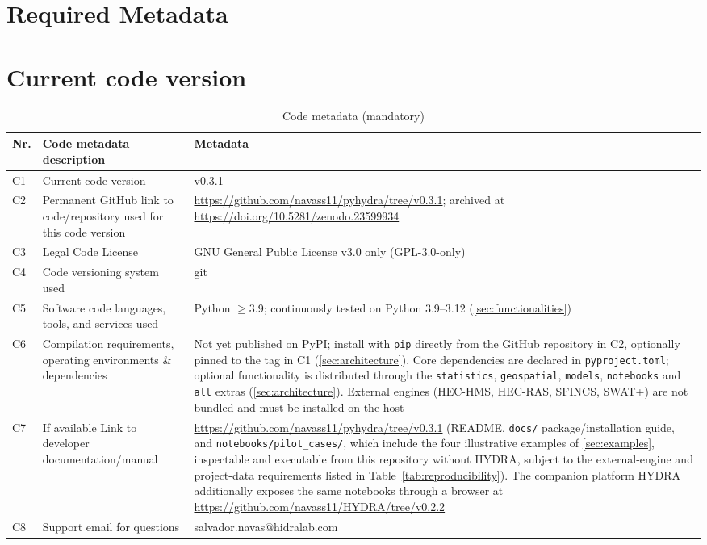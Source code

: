\documentclass[preprint,12pt,a4paper]{elsarticle}
\begin{document}
\section*{Required Metadata}
\label{sec:metadata}

\section*{Current code version}

\begin{table}[h]
\footnotesize
\begin{tabular}{@{}p{}p{}p{}@{}}
\toprule
Nr. & Code metadata description & Metadata \\
\midrule
C1 & Current code version & v0.3.1 \\[3pt]
C2 & Permanent GitHub link to code/repository used for this code version &
\url{https://github.com/navass11/pyhydra/tree/v0.3.1}; archived at
\url{https://doi.org/10.5281/zenodo.23599934} \\[3pt]
C3 & Legal Code License & GNU General Public License v3.0 only (GPL-3.0-only) \\[3pt]
C4 & Code versioning system used & git \\[3pt]
C5 & Software code languages, tools, and services used &
Python $\geq$3.9; continuously tested on Python 3.9--3.12 (\cref{sec:functionalities}) \\[3pt]
C6 & Compilation requirements, operating environments \& dependencies &
Not yet published on PyPI; install with \texttt{pip} directly from the
GitHub repository in C2, optionally pinned to the tag in C1
(\cref{sec:architecture}). Core dependencies are declared in
\texttt{pyproject.toml}; optional functionality is distributed through
the \texttt{statistics}, \texttt{geospatial}, \texttt{models},
\texttt{notebooks} and \texttt{all} extras (\cref{sec:architecture}). External engines (HEC-HMS,
HEC-RAS, SFINCS, SWAT+) are not bundled and must be installed on the
host \\[3pt]
C7 & If available Link to developer documentation/manual &
\url{https://github.com/navass11/pyhydra/tree/v0.3.1} (README,
\texttt{docs/} package/installation guide, and
\texttt{notebooks/pilot\_cases/}, which include the four illustrative
examples of \cref{sec:examples}, inspectable and executable from this
repository without HYDRA, subject to the external-engine and project-data
requirements listed in Table~\ref{tab:reproducibility}). The companion platform
HYDRA additionally exposes the same notebooks through a browser
at \url{https://github.com/navass11/HYDRA/tree/v0.2.2} \\[3pt]
C8 & Support email for questions & salvador.navas@hidralab.com \\
\bottomrule
\end{tabular}
\caption{Code metadata (mandatory)}
\label{tab:metadata}
\end{table}
\FloatBarrier
\end{document}
